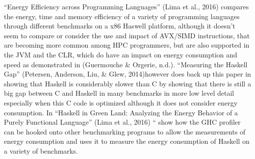 \documentclass{article}
\begin{document}
“Energy Efficiency across Programming Languages”  (Lima et al., 2016) compares the energy, time and memory efficiency of a variety of programming languages through different benchmarks on a x86 Haswell platform, although it doesn’t  seem to compare or consider the use and impact of AVX/SIMD instructions, that are becoming more common among HPC programmers, but are also supported in the JVM and the CLR, which do have an impact on energy consumption and speed as demonstrated in (Guermouche & Orgerie, n.d.). “Measuring the Haskell Gap” (Petersen, Anderson, Liu, & Glew, 2014)however does back up this paper in showing that Haskell is considerably slower than C by showing that there is still a big gap between C and Haskell in many benchmarks in more low level detail especially when this C code is optimized  although it does not consider energy consumption. In “Haskell in Green Land: Analyzing the Energy Behavior of a Purely Functional Language” (Lima et al., 2016) “ show how the GHC profiler can be hooked onto other benchmarking programs to allow the measurements of energy consumption and uses it to measure the energy consumption of Haskell on a variety of benchmarks.   
\end{document}
